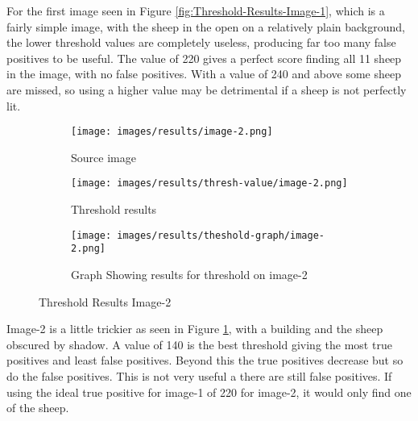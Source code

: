 For the first image seen in Figure \ref{fig:Threshold-Results-Image-1}, which is a fairly simple image, with the sheep in the open on a relatively plain background, the lower threshold values are completely useless, producing far too many false positives to be useful. The value of 220 gives a perfect score finding all 11 sheep in the image, with no false positives. With a value of 240 and above some sheep are missed, so using a higher value may be detrimental if a sheep is not perfectly lit. 

\begin{figure}[H]
    \centering

\begin{subfigure}{.5\textwidth}
    \centering
    \texttt{[image: images/results/image-2.png]}
    \caption{Source image}

\end{subfigure}%
\begin{subfigure}{.5\textwidth}
\centering
    \texttt{[image: images/results/thresh-value/image-2.png]}
    \caption{Threshold results}

\end{subfigure}
\begin{subfigure}{.9\textwidth}
\centering
    \texttt{[image: images/results/theshold-graph/image-2.png]}
    \caption{Graph Showing results for threshold on image-2}
\end{subfigure}%

    \caption{Threshold Results Image-2}
    \label{fig:Threshold-Results-Image-2}
\end{figure}

Image-2 is a little trickier as seen in Figure \ref{fig:Threshold-Results-Image-2}, with a building and the sheep obscured by shadow. A value of 140 is the best threshold giving the most true positives and least false positives. Beyond this the true positives decrease but so do the false positives. This is not very useful a there are still false positives. If using the ideal true positive for image-1 of 220 for image-2, it would only find one of the sheep.

